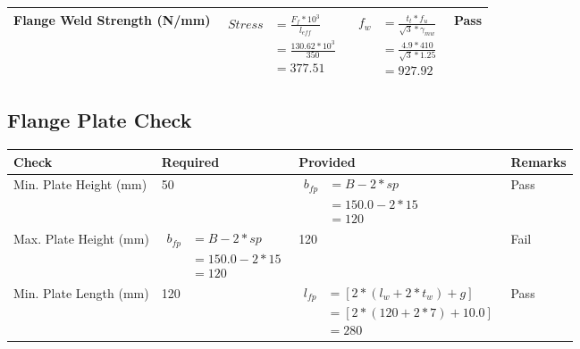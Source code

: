 \documentclass{article}%
\begin{document}
\begin{longtable}{|p{4cm}|p{5cm}|p{6.5cm}|p{1.5cm}|}
\hline%
Flange Weld Strength (N/mm)&$\begin{aligned} Stress &= \frac{F_f*10^3}{l_{eff}}\\  &= \frac{130.62*10^3}{350}\\ &= 377.51\end{aligned}$&$\begin{aligned} f_w &=\frac{t_t*f_u}{\sqrt{3}*\gamma_{mw}}\\ &=\frac{4.9*410}{\sqrt{3}*1.25}\\ &=927.92\end{aligned}$&Pass\\%
\hline%
\end{longtable}

%
\newpage%
\subsection{Flange Plate Check}%
\label{subsec:FlangePlateCheck}%
\renewcommand{\arraystretch}{1.2}%
\begin{longtable}{|p{3.5cm}|p{6cm}|p{6cm}|p{1.5cm}|}%
\hline%
\rowcolor{OsdagGreen}%
Check&Required&Provided&Remarks\\%
\hline%
\endhead%
\hline%
Min. Plate Height (mm)&50&$\begin{aligned} b_{fp} &= {B - 2*sp} \\ &= {150.0 - 2 * 15} \\ &=120\end{aligned}$&Pass\\%
\hline%
Max. Plate Height (mm)&$\begin{aligned} b_{fp} &= {B - 2*sp} \\ &= {150.0 - 2 * 15} \\ &=120\end{aligned}$&120&Fail\\%
\hline%
Min. Plate Length (mm)&120&$\begin{aligned} l_{fp} & = [2*(l_{w} + 2*t_w) + g]\\ &= [2*(120+2*7) +10.0]\\ &=280\end{aligned}$&Pass\\%
\hline%
\end{longtable}

%
\newpage%
\end{document}
